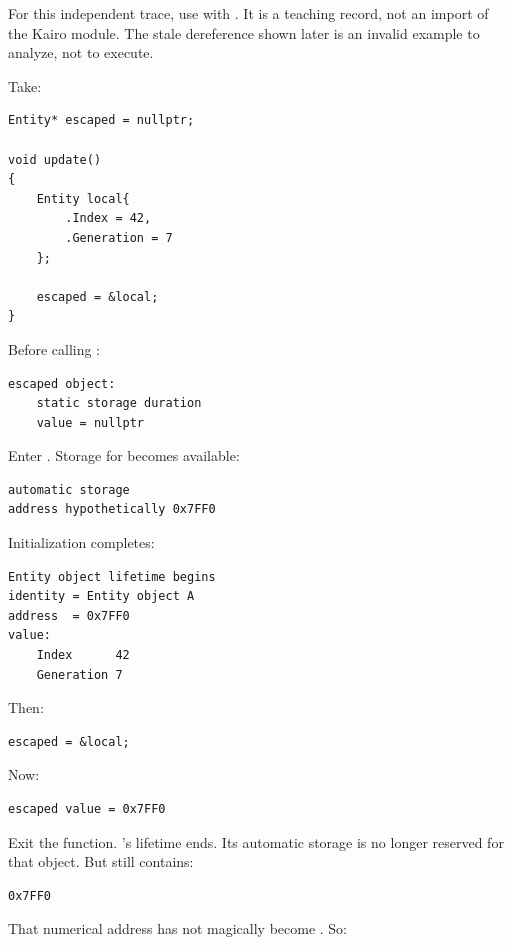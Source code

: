 For this independent trace, use  with . It is a teaching record, not an import of the Kairo module. The stale dereference shown later is an invalid example to analyze, not to execute.

Take:

\begin{verbatim}
Entity* escaped = nullptr;

void update()
{
    Entity local{
        .Index = 42,
        .Generation = 7
    };

    escaped = &local;
}
\end{verbatim}

Before calling :

\begin{verbatim}
escaped object:
    static storage duration
    value = nullptr
\end{verbatim}

Enter . Storage for  becomes available:

\begin{verbatim}
automatic storage
address hypothetically 0x7FF0
\end{verbatim}

Initialization completes:

\begin{verbatim}
Entity object lifetime begins
identity = Entity object A
address  = 0x7FF0
value:
    Index      42
    Generation 7
\end{verbatim}

Then:

\begin{verbatim}
escaped = &local;
\end{verbatim}

Now:

\begin{verbatim}
escaped value = 0x7FF0
\end{verbatim}

Exit the function. 's lifetime ends. Its automatic storage is no longer reserved for that object. But  still contains:

\begin{verbatim}
0x7FF0
\end{verbatim}

That numerical address has not magically become . So:

